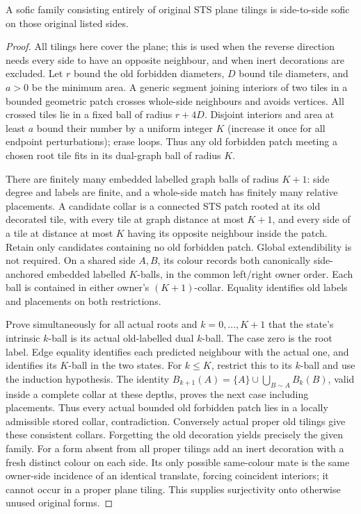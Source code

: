 \begin{lemma}\label{lem:collar-conversion}
A sofic family consisting entirely of original STS plane tilings is
side-to-side sofic on those original listed sides.
\end{lemma}
\begin{proof}
All tilings here cover the plane; this is used when the reverse direction
needs every side to have an opposite neighbour, and when inert decorations
are excluded. Let $r$ bound the old forbidden diameters, $D$ bound tile
diameters, and $a>0$ be the minimum area. A generic segment joining interiors of two
tiles in a bounded geometric patch crosses whole-side neighbours and avoids
vertices. All crossed tiles lie in a fixed ball of radius $r+4D$.
Disjoint interiors and area at least $a$ bound their number by a uniform
integer $K$ (increase it once for all endpoint perturbations); erase loops.
Thus any old forbidden patch meeting a chosen root tile fits in its
dual-graph ball of radius $K$.

There are finitely many embedded labelled graph balls of radius $K+1$:
side degree and labels are finite, and a whole-side match has finitely many
relative placements. A candidate collar is a connected STS patch rooted at
its old decorated tile, with every tile at graph distance at most $K+1$,
and every side of a tile at distance at most $K$ having its opposite
neighbour inside the patch. Retain only candidates containing no old
forbidden patch. Global extendibility is not required.
On a shared side $A,B$, its colour records both canonically side-anchored
embedded labelled $K$-balls, in the common left/right owner order. Each
ball is contained in either owner's $(K+1)$-collar. Equality identifies
old labels and placements on both restrictions.

Prove simultaneously for all actual roots and $k=0,\ldots,K+1$ that the
state's intrinsic $k$-ball is its actual old-labelled dual $k$-ball.
The case zero is the root label. Edge equality identifies each predicted
neighbour with the actual one, and identifies its $K$-ball in the two
states. For $k\leq K$, restrict this to its $k$-ball and use the induction
hypothesis. The identity
$B_{k+1}(A)=\{A\}\cup\bigcup_{B\sim A}B_k(B)$, valid inside a complete
collar at these depths, proves the next case including placements.
Thus every actual bounded old forbidden patch lies in a locally admissible
stored collar, contradiction. Conversely actual proper old tilings give
these consistent collars. Forgetting the old decoration yields precisely
the given family. For a form absent from all proper tilings add an inert
decoration with a fresh distinct colour on each side. Its only possible
same-colour mate is the same owner-side incidence of an identical translate,
forcing coincident interiors; it cannot occur in a proper plane tiling.
This supplies surjectivity onto otherwise unused original forms.
\end{proof}

